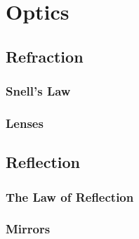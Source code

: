 \chapter{Optics}
	\section{Refraction}
		\subsection{Snell's Law}
		\subsection{Lenses}
	\section{Reflection}
		\subsection{The Law of Reflection}
		\subsection{Mirrors}
		
		
	

	



